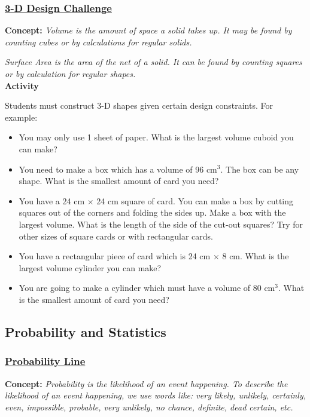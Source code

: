 		\subsubsection{\underline{3-D Design Challenge}}
		\textbf{Concept:} \emph{Volume is the amount of space a solid takes up. It may be found by counting cubes or by calculations for regular solids.}
		
		\emph{Surface Area is the area of the net of a solid. It can be found by counting squares or by calculation for regular shapes.}\\
		
		\noindent \textbf{Activity}
		
		\noindent Students must construct 3-D shapes given certain design constraints. For example:
		\begin{itemize}
		
	\item You may only use 1 sheet of paper. What is the largest volume cuboid you can make?
	\item You need to make a box which has a volume of 96 cm$^3$. The box can be any shape. What is the smallest amount of card you need?
	\item You have a 24 cm $\times$ 24 cm square of card. You can make a box by cutting squares out of the corners and folding the sides up. Make a box with the largest volume. What is the length of the side of the cut-out squares? Try for other sizes of square cards or with rectangular cards.
	\item You have a rectangular piece of card which is 24 cm $\times$ 8 cm. What is the largest volume cylinder you can make?
	\item You are going to make a cylinder which must have a volume of 80 cm$^3$. What is the smallest amount of card you need?	
	\end{itemize}
	
	\subsection{Probability and Statistics} \label{classactsprob}
	
		\subsubsection{\underline{Probability Line}}
		\textbf{Concept:} \emph{Probability is the likelihood of an event happening. To describe the likelihood of an event happening, we use words like: very likely, unlikely, certainly, even, impossible, probable, very unlikely, no chance, definite, dead certain, etc.}\\
		
